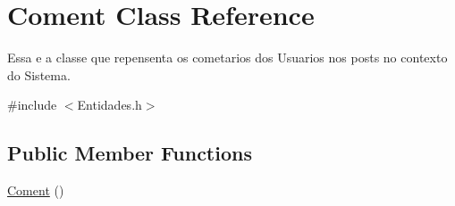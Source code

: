 \hypertarget{class_coment}{\section{Coment Class Reference}
\label{class_coment}
}


Essa e a classe que repensenta os cometarios dos Usuarios nos posts no contexto do Sistema.  




{\ttfamily \#include $<$Entidades.\-h$>$}

\subsection*{Public Member Functions}
\begin{DoxyCompactItemize}
\item 
\hypertarget{class_coment_a578e61870997d13095a9daf39f2863bc}{\hyperlink{class_coment_a578e61870997d13095a9daf39f2863bc}{Coment} ()}\label{class_coment_a578e61870997d13095a9daf39f2863bc}


\end{DoxyCompactItemize}
